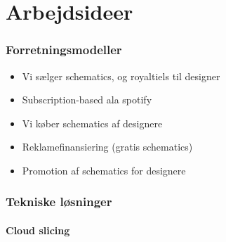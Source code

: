 \chapter{Arbejdsideer} %
\label{cha:arbejdsideer}

\subsection{Forretningsmodeller} %
\label{sub:forretningsmodeller}

\begin{itemize}
	\item Vi sælger schematics, og royaltiels til designer
	\item Subscription-based ala spotify
	\item Vi køber schematics af designere
	\item Reklamefinansiering (gratis schematics)
	\item Promotion af schematics for designere
\end{itemize}


\subsection{Tekniske løsninger} %
\label{sub:tekniske_l_sninger}

\subsubsection{Cloud slicing} %
\label{sub:cloud-slicing}







